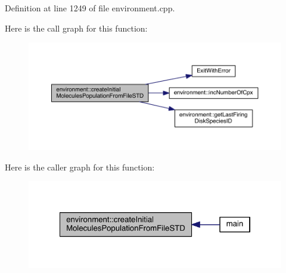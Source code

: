 Definition at line 1249 of file environment.\-cpp.



Here is the call graph for this function\-:
\nopagebreak
\begin{figure}[H]
\begin{center}
\leavevmode
\includegraphics[width=350pt]{a00014_aee77384e63261db28ef5677844bdbaf6_cgraph}
\end{center}
\end{figure}




Here is the caller graph for this function\-:
\nopagebreak
\begin{figure}[H]
\begin{center}
\leavevmode
\includegraphics[width=322pt]{a00014_aee77384e63261db28ef5677844bdbaf6_icgraph}
\end{center}
\end{figure}


